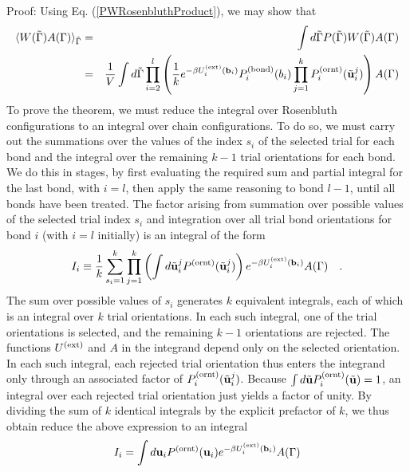 \documentclass[12pt]{article}
\newcommand{\vv}[1]{\mathbf{#1}}
\newcommand\chain{\Gamma}
\newcommand\Uext{U^{({\rm ext})}}
\newcommand\nbead{l}
\newcommand\vbond{\vv{b}}
\newcommand\ubond{\vv{u}}
\newcommand\rbond{b}
\newcommand\ntrial{k}
\newcommand\utrial{\tilde{\vv{u}}}
\newcommand\Pbond{P^{({\rm bond})}}
\newcommand\Pornt{P^{({\rm ornt})}}
\newcommand\rconfig{\tilde{\chain}}
\begin{document}
\noindent
Proof: Using Eq. (\ref{PWRosenbluthProduct}), we may show that
\begin{eqnarray}
   \langle W(\rconfig) A(\chain) \rangle_{\rconfig}
   & = & \int d\rconfig P(\rconfig)W(\rconfig) A(\chain) \\
   & = & \frac{1}{V} \int d\rconfig 
    \prod_{i=2}^{\nbead} \left (
    \frac{1}{k} e^{-\beta\Uext_{i}(\vbond_{i})}
                 \Pbond_{i}(\rbond_{i})
                 \prod_{j=1}^{\ntrial}
                 \Pornt_{i}(\utrial_{i}^{j}) \right )A(\chain)
    \nonumber
\end{eqnarray}
To prove the theorem, we must reduce the integral over Rosenbluth configurations to an integral over chain configurations. To do so, we must carry out the summations over the values of the index $s_{i}$ of the selected trial for each bond and the integral over the remaining $\ntrial - 1$ trial orientations for each bond. We do this in stages, by first evaluating the required sum and partial integral for the last bond, with $i=\nbead$, then apply the same reasoning to bond $\nbead-1$, until all bonds have been treated. The factor arising from summation over possible values of the selected trial index $s_{i}$ and integration over all trial bond orientations for bond $i$ (with $i=\nbead$ initially) is an integral of the form
\begin{equation}
   I_i \equiv \frac{1}{k} \sum_{s_{i}=1}^{\ntrial}
   \prod_{j=1}^{\ntrial} \left ( \int d\utrial_{i}^{j} 
   \Pornt(\utrial_{i}^{j}) \right ) 
   e^{-\beta\Uext_{i}(\vbond_{i})} A(\chain) 
   \quad.
\end{equation}
The sum over possible values of $s_{i}$ generates $\ntrial$ equivalent 
integrals, each of which is an integral over $\ntrial$ trial orientations. In each such integral, one of the trial orientations is selected, and the remaining $k-1$ orientations are rejected. The functions $\Uext$ and $A$ in the integrand depend only on the selected orientation. In each such integral, each rejected trial orientation thus enters the integrand only through an associated factor of $\Pornt_{i}(\utrial_{i}^{j})$. Because $\int d\utrial \Pornt_{i}(\utrial) =1$, an integral over each rejected trial orientation just yields a factor of unity. By dividing the sum of $k$ identical integrals by the explicit prefactor of $k$, we thus obtain reduce the above expression to an integral
\begin{equation}
   I_i = \int d\ubond_{i} \Pornt(\ubond_{i}) 
   e^{-\beta\Uext_{i}(\vbond_{i})} A(\chain) 
\end{equation}
\end{document}
